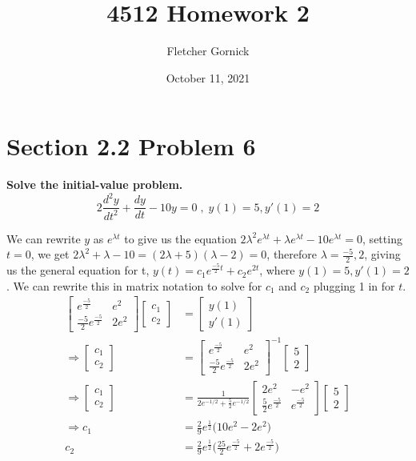 \documentclass[11pt]{article}
\title{4512 Homework 2}
\author{Fletcher Gornick}
\date{October 11, 2021}
\renewcommand{\l}{\lambda}
\begin{document}
 \maketitle 

 \section*{Section 2.2 Problem 6}
 \textbf{Solve the initial-value problem.}
 $$2\frac{d^2y}{dt^2} + \frac{dy}{dt} - 10y = 0 \;,\; y(1) = 5, y'(1) = 2$$

 We can rewrite $y$ as $e^{\l t}$ to give us the equation 
 $2\l^2 e^{\l t} + \l e^{\l t} - 10e^{\l t} = 0$, setting $t = 0$, we get 
 $2\l^2 + \l - 10 = (2\l + 5)(\l - 2) = 0$, therefore $\l = \frac{-5}{2}, 2$, giving us the 
 general equation for t, $y(t) = c_1e^{\frac{-5}{2}t} + c_2e^{2t}$, where $y(1) = 5, y'(1) = 2$.
 We can rewrite this in matrix notation to solve for $c_1$ and $c_2$ plugging 1 in for $t$.
\begin{align*}
&& \begin{bmatrix} e^{\frac{-5}{2}} & e^2 \\ \frac{-5}{2}e^{\frac{-5}{2}} & 2e^2 \end{bmatrix} 
\begin{bmatrix} c_1 \\ c_2 \end{bmatrix} &= \begin{bmatrix} y(1) \\ y'(1) \end{bmatrix} && \\
&& \Rightarrow \begin{bmatrix} c_1 \\ c_2 \end{bmatrix} &= 
\begin{bmatrix} e^{\frac{-5}{2}} & e^2 \\ \frac{-5}{2}e^{\frac{-5}{2}} & 2e^2 \end{bmatrix}^{-1}
\begin{bmatrix} 5 \\ 2 \end{bmatrix} && \\
&& \Rightarrow \begin{bmatrix} c_1 \\ c_2 \end{bmatrix} &= 
\frac{1}{2e^{-1/2} + \frac{5}{2}e^{-1/2}} 
\begin{bmatrix}
2e^2 & -e^2 \\ \frac{5}{2}e^{\frac{-5}{2}} & e^{\frac{-5}{2}} \end{bmatrix}
\begin{bmatrix} 5 \\ 2 \end{bmatrix} && \\
  && \Rightarrow c_1 &= \frac{2}{9}e^{\frac{1}{2}}\Big(10e^2 - 2e^2\Big) && \\
  && c_2 &= \frac{2}{9}e^{\frac{1}{2}}\Big(\frac{25}{2}e^{\frac{-5}{2}} + 2e^{\frac{-5}{2}}\Big)
\end{align*}
\end{document}
